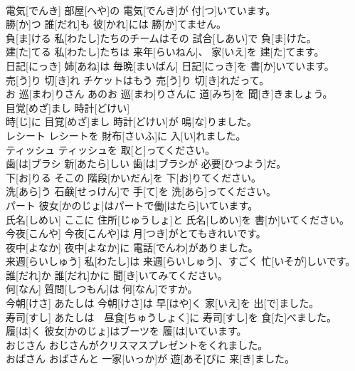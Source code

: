 \documentclass[8pt]{extreport}
\begin{document}
\begin{CJK}{UTF8}{min}
\\	電気[でんき]	部屋[へや]の 電気[でんき]が 付[つ]いています。		
\\	勝[か]つ	誰[だれ]も 彼[かれ]には 勝[か]てません。		
\\	負[ま]ける	私[わたし]たちのチームはその 試合[しあい]で 負[ま]けた。		
\\	建[た]てる	私[わたし]たちは 来年[らいねん]、 家[いえ]を 建[た]てます。		
\\	日記[にっき]	姉[あね]は 毎晩[まいばん] 日記[にっき]を 書[か]いています。		
\\	売[う]り 切[き]れ	チケットはもう 売[う]り 切[き]れだって。		
\\	お 巡[まわ]りさん	あのお 巡[まわ]りさんに 道[みち]を 聞[き]きましょう。		
\\	目覚[めざ]まし 時計[どけい]	
\\	時[じ]に 目覚[めざ]まし 時計[どけい]が 鳴[な]りました。		
\\	レシート	レシートを 財布[さいふ]に 入[い]れました。		
\\	ティッシュ	ティッシュを 取[と]ってください。		
\\	歯[は]ブラシ	新[あたら]しい 歯[は]ブラシが 必要[ひつよう]だ。		
\\	下[お]りる	そこの 階段[かいだん]を 下[お]りてください。		
\\	洗[あら]う	石鹸[せっけん]で 手[て]を 洗[あら]ってください。		
\\	パート	彼女[かのじょ]はパートで働[はたら]いています。		
\\	氏名[しめい]	ここに 住所[じゅうしょ]と 氏名[しめい]を 書[か]いてください。		
\\	今夜[こんや]	今夜[こんや]は 月[つき]がとてもきれいです。		
\\	夜中[よなか]	夜中[よなか]に 電話[でんわ]がありました。		
\\	来週[らいしゅう]	私[わたし]は 来週[らいしゅう]、すごく 忙[いそが]しいです。		
\\	誰[だれ]か	誰[だれ]かに 聞[き]いてみてください。		
\\	何[なん]	質問[しつもん]は 何[なん]ですか。		
\\	今朝[けさ]	あたしは 今朝[けさ]は 早[はや]く 家[いえ]を 出[で]ました。		
\\	寿司[すし]	あたしは　昼食[ちゅうしょく]に 寿司[すし]を 食[た]べました。		
\\	履[は]く	彼女[かのじょ]はブーツを 履[は]いています。		
\\	おじさん	おじさんがクリスマスプレゼントをくれました。		
\\	おばさん	おばさんと 一家[いっか]が 遊[あそ]びに 来[き]ました。		

\end{CJK}
\end{document}
